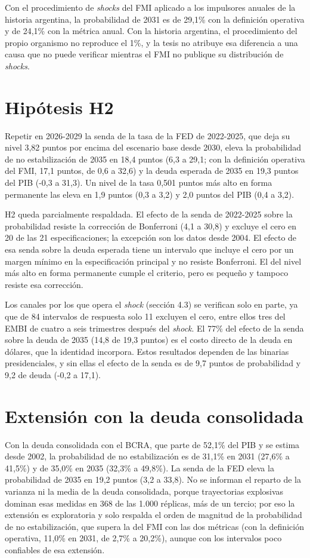 Con el procedimiento de \emph{shocks} del FMI aplicado a los impulsores
anuales de la historia argentina, la probabilidad de 2031 es de 29,1\%
con la definición operativa y de 24,1\% con la métrica anual. Con la
historia argentina, el procedimiento del propio organismo no reproduce
el 1\%, y la tesis no atribuye esa diferencia a una causa que no puede
verificar mientras el FMI no publique su distribución de \emph{shocks}.

\section{Hipótesis H2}

Repetir en 2026-2029 la senda de la tasa de la FED de 2022-2025, que
deja su nivel 3,82 puntos por encima del escenario base desde 2030,
eleva la probabilidad de no estabilización de 2035 en 18,4 puntos (6,3 a
29,1; con la definición operativa del FMI, 17,1 puntos, de 0,6 a 32,6) y
la deuda esperada de 2035 en 19,3 puntos del PIB (-0,3 a 31,3). Un nivel
de la tasa 0,501 puntos más alto en forma permanente las eleva en 1,9
puntos (0,3 a 3,2) y 2,0 puntos del PIB (0,4 a 3,2).

H2 queda parcialmente respaldada. El efecto de la senda de 2022-2025
sobre la probabilidad resiste la corrección de Bonferroni (4,1 a 30,8) y
excluye el cero en 20 de las 21 especificaciones; la excepción son los
datos desde 2004. El efecto de esa senda sobre la deuda esperada tiene
un intervalo que incluye el cero por un margen mínimo en la
especificación principal y no resiste Bonferroni. El del nivel más alto
en forma permanente cumple el criterio, pero es pequeño y tampoco
resiste esa corrección.

Los canales por los que opera el \emph{shock} (sección 4.3) se verifican
solo en parte, ya que de 84 intervalos de respuesta solo 11 excluyen el
cero, entre ellos tres del EMBI de cuatro a seis trimestres después del
\emph{shock}. El 77\% del efecto de la senda sobre la deuda de 2035
(14,8 de 19,3 puntos) es el costo directo de la deuda en dólares, que la
identidad incorpora. Estos resultados dependen de las binarias
presidenciales, y sin ellas el efecto de la senda es de 9,7 puntos de
probabilidad y 9,2 de deuda (-0,2 a 17,1).

\section{Extensión con la deuda consolidada}

Con la deuda consolidada con el BCRA, que parte de 52,1\% del PIB y se
estima desde 2002, la probabilidad de no estabilización es de 31,1\% en
2031 (27,6\% a 41,5\%) y de 35,0\% en 2035 (32,3\% a 49,8\%). La senda
de la FED eleva la probabilidad de 2035 en 19,2 puntos (3,2 a 33,8). No
se informan el reparto de la varianza ni la media de la deuda
consolidada, porque trayectorias explosivas dominan esas medidas en 368
de las 1.000 réplicas, más de un tercio; por eso la extensión es
exploratoria y solo respalda el orden de magnitud de la probabilidad de
no estabilización, que supera la del FMI con las dos métricas (con la
definición operativa, 11,0\% en 2031, de 2,7\% a 20,2\%), aunque con los
intervalos poco confiables de esa extensión.

